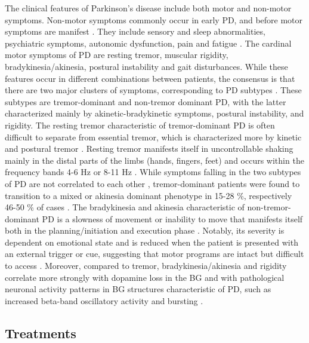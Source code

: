 The clinical features of Parkinson's disease include both motor and non-motor symptoms.
Non-motor symptoms commonly occur in early PD, and before motor symptoms are manifest
\cite{postuma_identifying_2012,khoo_spectrum_2013}. They include sensory and sleep
abnormalities, psychiatric symptoms, autonomic dysfunction, pain and fatigue
\cite{chaudhuri_non-motor_2006,khoo_spectrum_2013}.
%
The cardinal motor symptoms of PD are resting tremor, muscular rigidity,
bradykinesia/akinesia, postural instability and gait disturbances.
While these features occur in different combinations between patients,
the consensus is that there are two major clusters of symptoms, corresponding
to PD subtypes \cite{marras_parkinsons_2013}. These subtypes are tremor-dominant
and non-tremor dominant PD, with the latter characterized mainly by akinetic-bradykinetic
symptoms, postural instability, and rigidity.
%
The resting tremor characteristic of tremor-dominant PD is often difficult
to separate from essential tremor, which is characterized more by kinetic and postural
tremor \cite{bhidayasiri_differential_2005}.
Resting tremor manifests itself in uncontrollable shaking mainly in the distal parts of
the limbs (hands, fingers, feet) and occurs within the frequency bands 4-6 Hz or 8-11 Hz
\cite{koller_tremors_1989,moustafa_motor_2016}.
While symptoms falling in the two subtypes of PD are not correlated to each other
\cite{louis_clinical_2001}, tremor-dominant patients were found to transition to a mixed or akinesia
dominant phenotype in 15-28 \%, respectively 46-50 \% of cases \cite{voncoelin_motor_2015}.
%
The bradykinesia and akinesia characteristic of non-tremor-dominant PD is a slowness of movement
or inability to move that manifests itself both in the planning/initiation and execution phase
\cite{berardelli_pathophysiology_2001}. Notably, its severity is dependent on
emotional state and is reduced when the patient is presented with an external trigger or cue,
suggesting that motor programs are intact but difficult to access \cite{jankovic_parkinsons_2008}.
Moreover, compared to tremor, bradykinesia/akinesia and rigidity correlate more strongly
with dopamine loss in the BG \cite{albin_functional_1989,helmich_cerebral_2012,rodriguez-oroz_initial_2009}
and with pathological neuronal activity patterns in BG structures characteristic of PD,
such as increased beta-band oscillatory activity and bursting \cite{moran_subthalamic_2008,sharott_activity_2014}. %


\subsection{Treatments}
%

